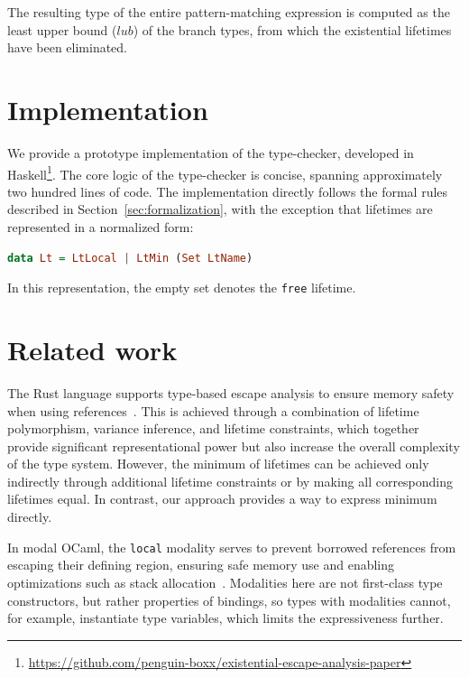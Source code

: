 \documentclass[11pt]{article}
\begin{document}
    The resulting type of the entire pattern-matching expression is computed as the least upper bound ($lub$) of the branch types, from which the existential lifetimes have been eliminated.


    \section{Implementation} \label{sec:implementation}

    We provide a prototype implementation of the type-checker, developed in Haskell\footnote{\url{https://github.com/penguin-boxx/existential-escape-analysis-paper}}.
    The core logic of the type-checker is concise, spanning approximately two hundred lines of code.
    The implementation directly follows the formal rules described in Section~\ref{sec:formalization}, with the exception that lifetimes are represented in a normalized form:
    \begin{lstlisting}[language=Haskell]
        data Lt = LtLocal | LtMin (Set LtName)
    \end{lstlisting}
    In this representation, the empty set denotes the \lstinline[language=Haskell]{free} lifetime.


    \section{Related work} \label{sec:related-work}

    The Rust language supports type-based escape analysis to ensure memory safety when using references~\cite{matsakis2014rust}.
    This is achieved through a combination of lifetime polymorphism, variance inference, and lifetime constraints, which together provide significant representational power but also increase the overall complexity of the type system.
    However, the minimum of lifetimes can be achieved only indirectly through additional lifetime constraints or by making all corresponding lifetimes equal.
    In contrast, our approach provides a way to express minimum directly.

    In modal OCaml, the \texttt{local} modality serves to prevent borrowed references from escaping their defining region, ensuring safe memory use and enabling optimizations such as stack allocation~\cite{lorenzen2024oxidizing}.
    Modalities here are not first-class type constructors, but rather properties of bindings, so types with modalities cannot, for example, instantiate type variables, which limits the expressiveness further.
\end{document}
